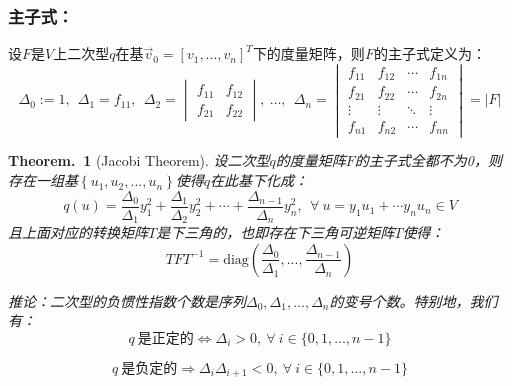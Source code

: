 \documentclass[zihao=5,UTF8]{report}
\theoremstyle{mystyle} %
\newtheorem{theorem}{Theorem.\,}
\begin{document}
\subsubsection{主子式：}
设$F$是$V$上二次型$q$在基$\vec{v}_0 = \left[v_1,...,v_n\right]^T$下的度量矩阵，则$F$的主子式定义为：
\begin{equation*}
    \Delta_0 := 1,\ \   \Delta_1 = f_{11},\ \  
    \Delta_2 =\begin{vmatrix}
        f_{11} & f_{12}\\
        f_{21} & f_{22 }
    \end{vmatrix} ,\ \dots ,\ \ 
    \Delta_n = 
    \begin{vmatrix}  
        f_{11}& f_{12}& \cdots  & f_{1n} \\  
        f_{21}& f_{22}& \cdots  & f_{2n} \\  
        \vdots & \vdots & \ddots & \vdots \\  
        f_{n1}& f_{n2}& \cdots  & f_{nn}  
      \end{vmatrix}  
    = \left | F \right |       
\end{equation*}
\begin{theorem}[Jacobi Theorem]
    设二次型$q$的度量矩阵$F$的主子式全都不为0，则存在一组基$\left\{u_1,u_2,...,u_n\right\}$使得$q$在此基下化成：
    \begin{equation*}
        q(u) = \frac{\Delta_0}{\Delta_1}y_1^2 + \frac{\Delta_1}{\Delta_2}y_2^2+ \cdots +\frac{\Delta_{n-1}}{\Delta_n}y_n^2,\  \ \forall \ u = y_1u_1 + \cdots y_nu_n \in V
    \end{equation*}
    且上面对应的转换矩阵$T$是下三角的，也即存在下三角可逆矩阵$T$使得：
    \begin{equation*}
        TFT^{-1} = \text{diag}(\frac{\Delta_0}{\Delta_1},...,\frac{\Delta_{n-1}}{\Delta_n} )
    \end{equation*}\par
    推论：二次型的负惯性指数个数是序列$\Delta_0,\Delta_1,\dots,\Delta_n$的变号个数。特别地，我们有：
    \begin{equation*}
        q \ \text{是正定的}\Longleftrightarrow \Delta_i >0,\ \forall\  i \in \{0,1,...,n-1\}
    \end{equation*}
{\par\color{gray}\small
\begin{equation*}
    q \ \text{是负定的}\Longrightarrow \Delta_i\Delta_{i+1}<0,\ \forall\  i \in \{0,1,...,n-1\}
\end{equation*}
\par}

\end{theorem}
\end{document}
